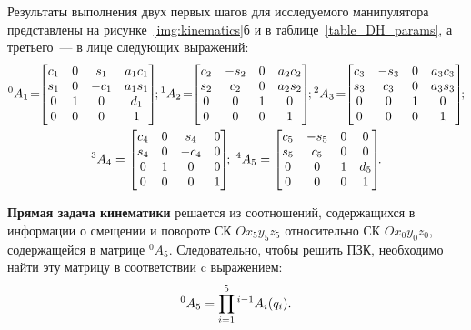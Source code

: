 Результаты выполнения двух первых шагов для исследуемого манипулятора представлены на рисунке~\ref{img:kinematics}б и в таблице~\ref{table_DH_params}, а третьего~--- в лице следующих выражений:
\begin{gather}\label{eq_all_ht_matrices}
	{}^0A_1\! =\!\!
    \left[\begin{matrix}c_1 & 0 & s_1 & a_{1} c_1\\s_1 & 0 & - c_1 & a_{1} s_1\\0 & 1 & 0 & d_{1}\\0 & 0 & 0 & 1\end{matrix}\right]\!\!;
	{}^1A_2\! =\!\!
	\left[\begin{matrix}c_2 & - s_2 & 0 & a_{2} c_2\\s_2 & c_2 & 0 & a_{2} s_2\\0 & 0 & 1 & 0\\0 & 0 & 0 & 1\end{matrix}\right]\!\!;
	{}^2A_3\! =\!\!
	\left[\begin{matrix}c_3 & - s_3 & 0 & a_{3} c_3\\s_3 & c_3 & 0 & a_{3} s_3\\0 & 0 & 1 & 0\\0 & 0 & 0 & 1\end{matrix}\right]\!\!;\notag
	\\
	{}^3A_4 =
	 \left[\begin{matrix}c_4 & 0 & s_4 & 0\\s_4 & 0 & - c_4 & 0\\0 & 1 & 0 & 0\\0 & 0 & 0 & 1\end{matrix}\right]\!\!;
	\;
	{}^4A_5 =
	\left[\begin{matrix}c_5 & - s_5 & 0 & 0\\s_5 & c_5 & 0 & 0\\0 & 0 & 1 & d_{5}\\0 & 0 & 0 & 1\end{matrix}\right]\!\!\ldotp
\end{gather}

\textbf{Прямая задача кинематики}\label{part_kinematics_forward} решается из  соотношений, содержащихся в информации о смещении и повороте СК $Ox_5y_5z_5$ относительно СК $Ox_0y_0z_0$, содержащейся в матрице ${}^0A_5$.
Следовательно, чтобы решить ПЗК, необходимо найти эту матрицу в соответствии c выражением:
\begin{equation}\label{fk}
	{}^0A_5 = \prod^{5}_{i=1}{{}^{i-1}A_i(q_i)}\ldotp
\end{equation}

